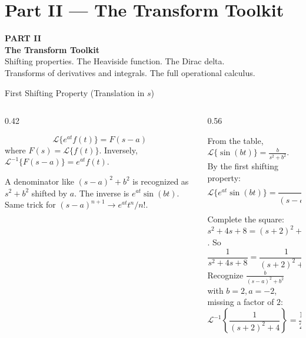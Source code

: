 \documentclass[aspectratio=169,11pt]{beamer}
\begin{document}

\section{Part II --- The Transform Toolkit}

{
\begin{frame}[plain]
\vspace{2cm}
{\color{accentorange}\Huge\textbf{PART II}}\\[0.4cm]
{\color{white}\Huge\textbf{The Transform Toolkit}}\\[0.8cm]
{\color{white!85}\large Shifting properties. The Heaviside function. The Dirac delta.\\
Transforms of derivatives and integrals. The full operational calculus.}
\end{frame}
}

\begin{frame}{First Shifting Property (Translation in $s$)}
\footnotesize
\begin{columns}[T]
\begin{column}{0.42\textwidth}
\begin{formulabox}
\[\mathcal{L}\{e^{at} f(t)\} = F(s - a)\]
where $F(s) = \mathcal{L}\{f(t)\}$. Inversely, $\mathcal{L}^{-1}\{F(s-a)\} = e^{at} f(t)$.
\end{formulabox}
\vspace{0.5mm}
\begin{methodbox}
A denominator like $(s-a)^2 + b^2$ is recognized as $s^2 + b^2$ shifted by $a$. The inverse is $e^{at}\sin(bt)$. Same trick for $(s-a)^{n+1} \to e^{at} t^n / n!$.
\end{methodbox}
\end{column}
\begin{column}{0.56\textwidth}
\begin{examplebox}
From the table, $\mathcal{L}\{\sin(bt)\} = \frac{b}{s^2 + b^2}$. By the first shifting property:
\[\mathcal{L}\{e^{at}\sin(bt)\} = \frac{b}{(s-a)^2 + b^2}, \quad s > a\]
\end{examplebox}
\vspace{0.5mm}
\begin{examplebox}
Complete the square: $s^2+4s+8 = (s+2)^2 + 4$. So
\[\frac{1}{s^2+4s+8} = \frac{1}{(s+2)^2 + 2^2}\]
Recognize $\frac{b}{(s-a)^2+b^2}$ with $b=2, a=-2$, missing a factor of $2$:
\[\mathcal{L}^{-1}\!\left\{\frac{1}{(s+2)^2+4}\right\} = \frac{1}{2}\,e^{-2t}\sin(2t)\]
\end{examplebox}
\end{column}
\end{columns}
\end{frame}
\end{document}
